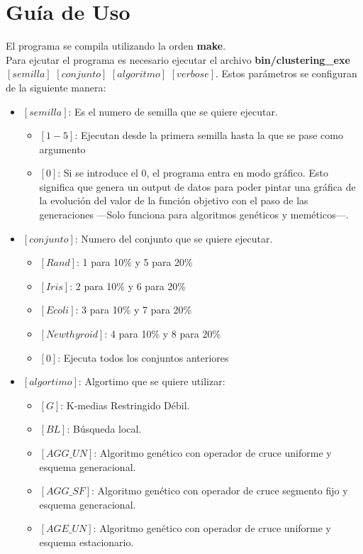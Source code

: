 \newpage
\section{Guía de Uso}
El programa se compila utilizando la orden \textbf{make}.\\
Para ejcutar el programa es necesario ejecutar el archivo \textbf{bin/clustering\_exe} $[semilla]$ $[conjunto]$ $[algoritmo]$ $[verbose]$.
Estos parámetros se configuran de la siguiente manera:
\begin{itemize}
   \item $[semilla]$: Es el numero de semilla que se quiere ejecutar.
   \begin{itemize}
      \item $[1-5]$: Ejecutan desde la primera semilla hasta la que se pase como argumento
      \item $[0]$: Si se introduce el 0, el programa entra en modo gráfico. Esto significa que genera un output de datos para poder pintar una gráfica de la evolución del valor de la función objetivo con el paso de las generaciones ---Solo funciona para algoritmos genéticos y meméticos---.
   \end{itemize}
   \item $[conjunto]$: Numero del conjunto que se quiere ejecutar.
   \begin{itemize}
      \item $[Rand]$: 1 para 10\% y 5 para 20\%
      \item $[Iris]$: 2 para 10\% y 6 para 20\%
      \item $[Ecoli]$: 3 para 10\% y 7 para 20\%
      \item $[Newthyroid]$: 4 para 10\% y 8 para 20\%
      \item $[0]$: Ejecuta todos los conjuntos anteriores
   \end{itemize}
   \item $[algortimo]$: Algortimo que se quiere utilizar:
   \begin{itemize}
      \item $[G]$: K-medias Restringido Débil.
      \item $[BL]$: Búsqueda local.
      \item $[AGG\_UN]$: Algoritmo genético con operador de cruce uniforme y esquema generacional.
      \item $[AGG\_SF]$: Algoritmo genético con operador de cruce segmento fijo y esquema generacional.
      \item $[AGE\_UN]$: Algoritmo genético con operador de cruce uniforme y esquema estacionario.

\end{itemize}
\end{itemize}
